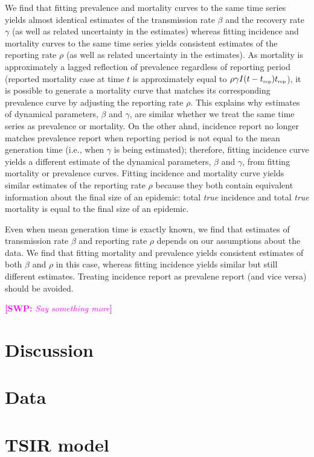 \documentclass{article}
\newcommand{\comment}[3]{\textcolor{#1}{\textbf{[#2: }\textsl{#3}\textbf{]}}}
\newcommand{\swp}[1]{\comment{magenta}{SWP}{#1}}
\newcommand{\tsub}[2]{#1_{{\textrm{\tiny #2}}}}
\begin{document}
We find that fitting prevalence and mortality curves to the same time series yields almost identical estimates of the transmission rate $\beta$ and the recovery rate $\gamma$ (as well as related uncertainty in the estimates) whereas fitting incidence and mortality curves to the same time series yields consistent estimates of the reporting rate $\rho$  (as well as related uncertainty in the estimates).
As mortality is approximately a lagged reflection of prevalence regardless of reporting period (reported mortality case at time $t$ is approximately equal to $\rho \gamma I(t-\tsub{t}{rep}) \tsub{t}{rep}$), 
it is possible to generate a mortality curve that matches its corresponding prevalence curve by adjusting the reporting rate $\rho$.
This explains why estimates of dynamical parameters, $\beta$ and $\gamma$, are similar whether we treat the same time series as prevalence or mortality.
On the other ahnd, incidence report no longer matches prevalence report when reporting period is not equal to the mean generation time (i.e., when $\gamma$ is being estimated); therefore, fitting incidence curve yields a different estimate of the dynamical parameters, $\beta$ and $\gamma$, from fitting mortality or prevalence curves.
Fitting incidence and mortality curve yields similar estimates of the reporting rate $\rho$ because they both contain equivalent information about the final size of an epidemic: total \emph{true} incidence and total \emph{true} mortality is equal to the final size of an epidemic.

Even when mean generation time is exactly known, we find that estimates of transmission rate $\beta$ and reporting rate $\rho$ depends on our assumptions about the data.
We find that fitting mortality and prevalence yields consistent estimates of both $\beta$ and $\rho$ in this case, whereas fitting incidence yields similar but still different estimates.
Treating incidence report as prevalene report (and vice versa) should be avoided.

\swp{Say something more}


\section{Discussion}

\section{Data}

\section{TSIR model}
\end{document}
